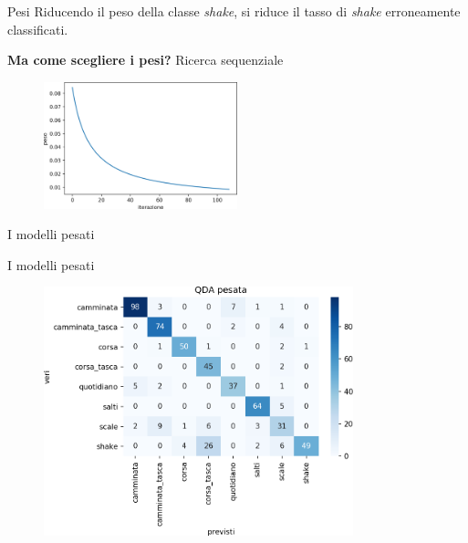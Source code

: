 \documentclass{beamer}
\begin{document}
\begin{frame}{Pesi}
Riducendo il peso della classe {\em shake}, si riduce il tasso di {\em shake} erroneamente classificati.

\textbf{Ma come scegliere i pesi?} \pause Ricerca sequenziale
\begin{figure}[H]
\includegraphics[width=0.5\textwidth]{../figure/andamento-pesi.png}
\end{figure}

\end{frame}

\begin{frame}{I modelli pesati}

\end{frame}

\begin{frame}{I modelli pesati}
\begin{figure}[H]
\includegraphics[width=0.8\textwidth]{../figure/confusionMatrix-QDA-penalizzata.png}
\end{figure}
\end{frame}
\end{document}
